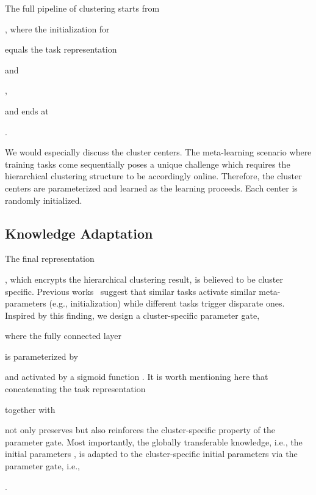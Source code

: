 \documentclass{article}
\begin{document}
The full pipeline of clustering starts from \begin{small}\end{small}, where the initialization for 
\begin{small}

\end{small}
equals the task representation \begin{small}\end{small} and \begin{small}
,
\end{small}
and ends at \begin{small}
.
\end{small}
We would especially discuss the cluster centers. 
The meta-learning scenario where training tasks come sequentially poses a unique challenge which requires the hierarchical clustering structure to be accordingly online. 
Therefore, the cluster centers are parameterized and learned as the learning proceeds. Each center is randomly initialized.
\subsection{Knowledge Adaptation}
The final representation 
\begin{small}

\end{small}, which encrypts the hierarchical clustering result, 
is believed to be cluster specific.
Previous works~\cite{xu2015show,lee2018gradient} suggest that similar tasks activate similar meta-parameters (e.g., initialization) while different tasks trigger disparate ones. Inspired by this finding, we design a cluster-specific parameter gate, 

where the fully connected layer \begin{small}\end{small} is parameterized by \begin{small}\end{small} and activated by a sigmoid function .
It is worth mentioning here that concatenating the task representation \begin{small}

\end{small} together with \begin{small}

\end{small}
not only preserves but also reinforces the cluster-specific property of the parameter gate. Most importantly, the globally transferable knowledge, i.e., the initial parameters , is adapted to the cluster-specific initial parameters  via the parameter gate, i.e., 
\begin{small}\end{small}.
\end{document}
